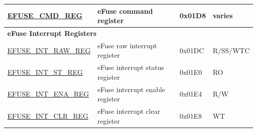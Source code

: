 \begin{longtable}{ | p{7.2cm} | p{6cm} | p{1.3cm} | p{1cm} | }
\hyperref[regdesc:EFUSECMDREG]{EFUSE\_CMD\_REG} & eFuse command register & 0x01D8 & varies \\ \hline
\multicolumn{4}{|l|}{\textbf{eFuse Interrupt Registers}} \\ \hline
\hyperref[regdesc:EFUSEINTRAWREG]{EFUSE\_INT\_RAW\_REG} & eFuse raw interrupt register & 0x01DC & R/SS/WTC \\ \hline
\hyperref[regdesc:EFUSEINTSTREG]{EFUSE\_INT\_ST\_REG} & eFuse interrupt status register & 0x01E0 & RO \\ \hline
\hyperref[regdesc:EFUSEINTENAREG]{EFUSE\_INT\_ENA\_REG} & eFuse interrupt enable register & 0x01E4 & R/W \\ \hline
\hyperref[regdesc:EFUSEINTCLRREG]{EFUSE\_INT\_CLR\_REG} & eFuse interrupt clear register & 0x01E8 & WT \\ \hline
\end{longtable}
